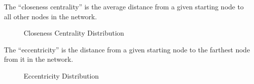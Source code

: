 The ``closeness centrality'' is the average distance from a given starting node to all other nodes in the network.

\begin{figure}[h!]
\centering
{}
\caption{Closeness Centrality Distribution}
\label{fig:closeness}
\end{figure}

\clearpage

The ``eccentricity'' is the distance from a given starting node to the farthest node from it in the network.

\begin{figure}[h!]
\centering
{}
\caption{Eccentricity Distribution}
\label{fig:eccentricity}
\end{figure}

